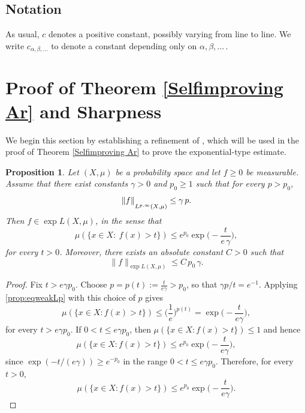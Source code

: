 \documentclass[reqno, 10pt, oneside]{amsart}
\numberwithin{equation}{section}
\newcommand{\strt}[1]{\rule{0pt}{#1}}
\newtheorem{proposition}[theorem]{Proposition}
\numberwithin{theorem}{section}
\newcommand{\1}{{\rm 1\hspace*{-0.4ex}%
\rule{0.1ex}{1.52ex}\hspace*{0.2ex}}}
\begin{document}
\subsection*{Notation}
As usual, $c$ denotes a positive constant, possibly varying from line to line. We write $c_{\alpha, \beta, ...}$ to denote a constant depending only on $\alpha, \beta,...\,$. 







\section{Proof of Theorem \ref{Selfimproving Ar} and Sharpness} \label{good lambda}

We begin this section by establishing a refinement of \cite[Proposition 2.3]{CP}, which will be used in the proof of Theorem \ref{Selfimproving Ar} to prove the exponential-type estimate.



\begin{proposition}\label{prop:linearweakLptoexpL}
Let $(X,\mu)$ be a probability space and let $f\ge 0$ be measurable. Assume that there exist constants $\gamma>0$ and $p_0\ge 1$ such that for every $p>p_0$,
\begin{equation}\label{prop:eqweakLp}
\|f\|_{\strt{2.3ex} L^{p,\infty}(X,\mu)}\le \gamma\,p.
\end{equation}
Then $f\in \exp L (X,\mu)$, in the sense that 
\begin{equation*}
\mu(\{x\in X:\ f(x)>t\})\le e^{p_0} \exp\Big(-\frac{t}{e\,\gamma}\Big),
\end{equation*}
for every $t>0$. Moreover, there exists an absolute constant $C>0$ such that
\begin{equation*}
\|f\|_{\exp L(X,\mu)} \le C \, p_0 \, \gamma  .
\end{equation*}
\end{proposition}
 

\begin{proof}
Fix $t>e\gamma p_0$. Choose $p=p(t):=\frac{t}{e\gamma}>p_0$, so that $\gamma p/t=e^{-1}$. Applying \eqref{prop:eqweakLp} with this choice of $p$ gives
\begin{equation*}
    \mu(\{x\in X: f(x)>t\}) \le \Big(\frac{1}{e}\Big)^{p(t)} = \exp\Big(-\frac{t}{e\gamma}\Big),
\end{equation*}
for every $t>e\gamma p_0$.  If $0<t\le e\gamma p_0$, then $\mu(\{x\in X: f(x)>t\})\le 1$ and hence
\begin{equation*}
    \mu(\{x\in X: f(x)>t\})
\le e^{p_0}\exp\Big(-\frac{t}{e\gamma}\Big),
\end{equation*}
since $\exp(-t/(e\gamma))\ge e^{-p_0}$ in the range $0<t\le e\gamma p_0$. Therefore, for every $t>0$,
\begin{equation*}
    \mu(\{x\in X: f(x)>t\})\le e^{p_0}\exp\Big(-\frac{t}{e\gamma}\Big).
\end{equation*}
\end{proof}
\end{document}

